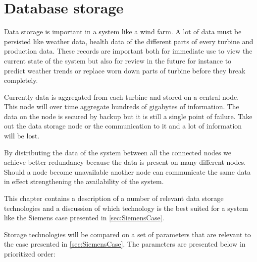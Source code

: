 \section{Database storage}
\label{sec:databaseStorage}
Data storage is important in a system like a wind farm.
A lot of data must be persisted like weather data, health data of the different parts of every turbine and production data.
These records are important both for immediate use to view the current state of the system but also for review in the future for instance to predict weather trends or replace worn down parts of turbine before they break completely.

Currently data is aggregated from each turbine and stored on a central node.
This node will over time aggregate hundreds of gigabytes of information.
The data on the node is secured by backup but it is still a single point of failure.
Take out the data storage node or the communication to it and a lot of information will be lost.

By distributing the data of the system between all the connected nodes we achieve better redundancy because the data is present on many different nodes.
Should a node become unavailable another node can communicate the same data in effect strengthening the availability of the system.

This chapter contains a description of a number of relevant data storage technologies and a discussion of which technology is the best suited for a system like the Siemens case presented in \cref{sec:SiemensCase}.

Storage technologies will be compared on a set of parameters that are relevant to the case presented in \cref{sec:SiemensCase}. The parameters are presented below in prioritized order:

